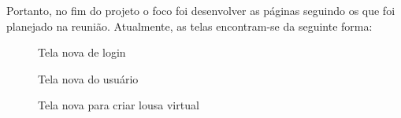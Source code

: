 Portanto, no fim do projeto o foco foi desenvolver as páginas seguindo os que foi planejado na reunião. Atualmente, as telas encontram-se da seguinte forma:

\begin{figure}[H]
  \centering
  \caption{Tela nova de login}\label{figura:loginNovo}
\end{figure}

\begin{figure}[H]
  \centering
  \caption{Tela nova do usuário}\label{figura:indexNovo}
\end{figure}

\begin{figure}[H]
  \centering
  \caption{Tela nova para criar lousa virtual}\label{figura:criarNovo}
\end{figure}

